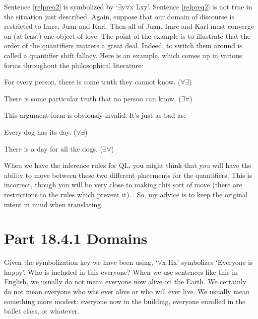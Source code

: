 Sentence \ref{relpreq2} is symbolized by ‘$\exists$y$\forall$x Lxy’. Sentence \ref{relpreq2} is not true in the situation just described. Again, suppose that our domain of discourse is restricted to Imre, Juan and Karl. Then all of Juan, Imre and Karl must converge on (at least) one object of love. The point of the example is to illustrate that the order of the quantifiers matters a great deal. Indeed, to switch them around is called a quantifier shift fallacy. Here is an example, which comes up in various forms throughout the philosophical literature:
\begin{earg}
\item[]For every person, there is some truth they cannot know. ($\forall$$\exists$)
\item[\therefore] There is some particular truth that no person can know. ($\exists$$\forall$)
\end{earg}
This argument form is obviously invalid. It’s just as bad as:
\begin{earg}
\item[]Every dog has its day. ($\forall$$\exists$)
\item[\therefore] There is a day for all the dogs. ($\exists$$\forall$)
\end{earg}
When we have the inference rules for QL, you might think that you will have the ability to move between these two different placements for the quantifiers. This is incorrect, though you will be very close to making this sort of move (there are restrictions to the rules which prevent it).  So, my advice is to keep the original intent in mind when translating.

\aristotle

\section{Part 18.4.1 Domains}
Given the symbolization key we have been using, ‘$\forall$x Hx’ symbolizes ‘Everyone is happy’. Who is included in this everyone? When we use sentences like this in English, we usually do not mean everyone now alive on the Earth. We certainly do not mean everyone who was ever alive or who will ever live. We usually mean something more modest: everyone now in the building, everyone enrolled in the ballet class, or whatever.

